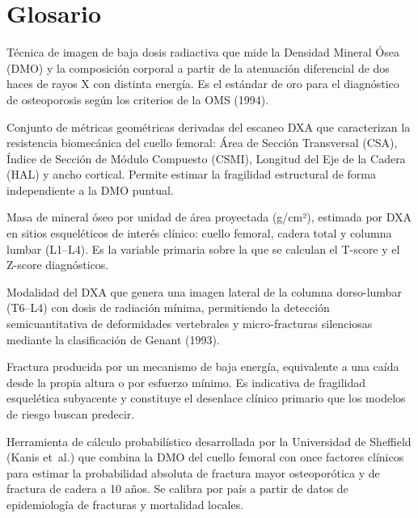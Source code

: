 \documentclass[../tesis.tex]{subfiles}
\begin{document}
\chapter*{Glosario}

\begin{description}[font=\bfseries, leftmargin=4cm, style=nextline]

    \item[Absorciometría de Rayos X de Energía Dual (DXA)]
    Técnica de imagen de baja dosis radiactiva que mide la Densidad Mineral Ósea (DMO) y la
    composición corporal a partir de la atenuación diferencial de dos haces de rayos X con
    distinta energía. Es el estándar de oro para el diagnóstico de osteoporosis según los
    criterios de la OMS (1994).

    \item[Análisis Estructural de Cadera (HSA)]
    Conjunto de métricas geométricas derivadas del escaneo DXA que caracterizan la resistencia
    biomecánica del cuello femoral: Área de Sección Transversal (CSA), Índice de Sección de
    Módulo Compuesto (CSMI), Longitud del Eje de la Cadera (HAL) y ancho cortical. Permite
    estimar la fragilidad estructural de forma independiente a la DMO puntual.

    \item[Densidad Mineral Ósea (DMO / BMD)]
    Masa de mineral óseo por unidad de área proyectada (g/cm²), estimada por DXA en sitios
    esqueléticos de interés clínico: cuello femoral, cadera total y columna lumbar (L1--L4).
    Es la variable primaria sobre la que se calculan el T-score y el Z-score diagnósticos.

    \item[Evaluación de Fractura Vertebral (VFA)]
    Modalidad del DXA que genera una imagen lateral de la columna dorso-lumbar (T6--L4) con
    dosis de radiación mínima, permitiendo la detección semicuantitativa de deformidades
    vertebrales y micro-fracturas silenciosas mediante la clasificación de Genant (1993).

    \item[Fractura por fragilidad]
    Fractura producida por un mecanismo de baja energía, equivalente a una caída desde la propia
    altura o por esfuerzo mínimo. Es indicativa de fragilidad esquelética subyacente y constituye
    el desenlace clínico primario que los modelos de riesgo buscan predecir.

    \item[FRAX]
    Herramienta de cálculo probabilístico desarrollada por la Universidad de Sheffield (Kanis
    et~al.) que combina la DMO del cuello femoral con once factores clínicos para estimar la
    probabilidad absoluta de fractura mayor osteoporótica y de fractura de cadera a 10 años.
    Se calibra por país a partir de datos de epidemiología de fracturas y mortalidad locales.


\end{description}
\end{document}
